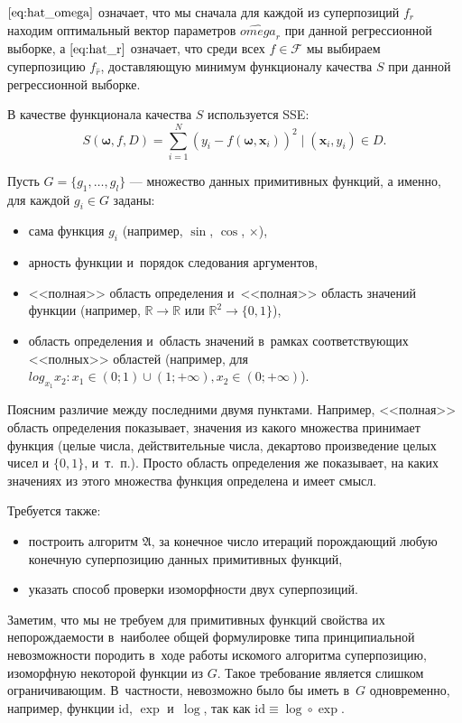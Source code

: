 \documentclass[12pt,a4paper]{amsart}
\begin{document}
$\eqref{eq:hat_omega}$ означает, что мы сначала для каждой из суперпозиций
$f_r$ находим оптимальный вектор параметров $\hat{omega}_r$ при
данной регрессионной выборке, а $\eqref{eq:hat_r}$ означает,
что среди всех $f \in \mathcal{F}$ мы выбираем суперпозицию $f_{\hat{r}}$,
доставляющую минимум функционалу качества $S$ при данной регрессионной
выборке.

В качестве функционала качества $S$ используется SSE:
\begin{equation}
  \label{eq:sse_expr}
  S(\boldsymbol{\omega}, f, D) = \sum_{i=1}^N (y_i - f (\boldsymbol{\omega}, \mathbf{x}_i))^2 \mid (\mathbf{x}_i, y_i) \in D.
\end{equation}

Пусть $G = \{ g_1, \dots, g_l \}$ --- множество данных примитивных
функций, а именно, для каждой $g_i \in G$ заданы:
\begin{itemize}
  \item сама функция $g_i$ (например, $\sin$, $\cos$, $\times$),
  \item арность функции и~порядок следования аргументов,
  \item <<полная>> область определения и~<<полная>> область значений функции
	(например, $\mathbb{R} \to \mathbb{R}$ или $\mathbb{R}^2 \to \{0, 1\}$),
  \item область определения и~область значений в~рамках соответствующих
	<<полных>> областей (например, для $log_{x_1} x_2 : x_1 \in (0; 1) \cup (1; +\infty), x_2 \in (0; +\infty)$).
\end{itemize}

Поясним различие между последними двумя пунктами. Например, <<полная>>
область определения показывает, значения из какого множества принимает
функция (целые числа, действительные числа, декартово произведение целых
чисел и $\{0, 1\}$, и~т.~п.). Просто область определения же показывает,
на каких значениях из этого множества функция определена и имеет смысл.

Требуется также:
\begin{itemize}
  \item построить алгоритм $\mathfrak{A}$, за конечное число итераций
	порождающий любую конечную суперпозицию данных примитивных функций,
  \item указать способ проверки изоморфности двух суперпозиций.
\end{itemize}

Заметим, что мы не требуем для примитивных функций свойства их
непорождаемости в~наиболее общей формулировке типа принципиальной
невозможности породить в~ходе работы искомого алгоритма суперпозицию,
изоморфную некоторой функции из $G$. Такое требование является слишком
ограничивающим. В~частности, невозможно было бы иметь в~$G$ одновременно,
например, функции $\text{id}$, $\exp$ и~$\log$, так как
$\text{id} \equiv \log \circ \exp$.
\end{document}
